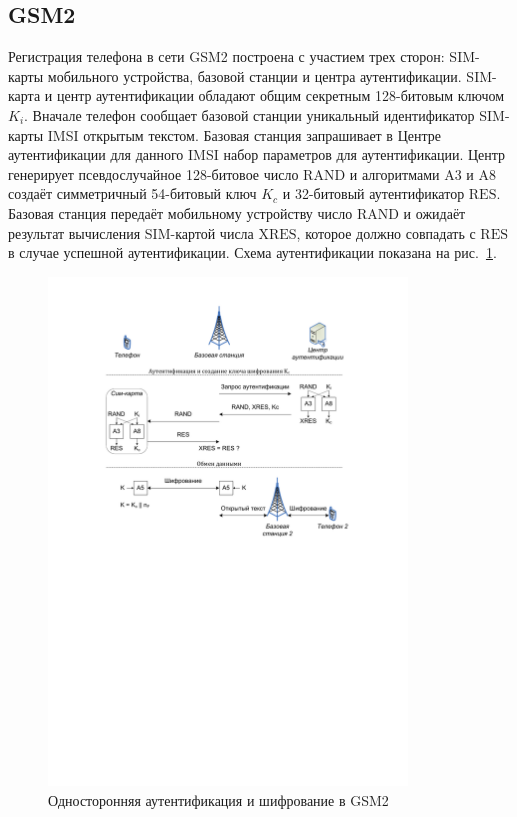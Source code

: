 \subsection{GSM2}

Регистрация телефона в сети GSM2 построена с участием трех сторон: SIM-карты мобильного устройства, базовой станции и центра аутентификации. SIM-карта и центр аутентификации обладают общим секретным 128-битовым ключом $K_i$. Вначале телефон сообщает базовой станции уникальный идентификатор SIM-карты IMSI открытым текстом. Базовая станция запрашивает в Центре аутентификации для данного IMSI набор параметров для аутентификации. Центр генерирует псевдослучайное 128-битовое число $\textrm{RAND}$ и алгоритмами A3 и A8 создаёт симметричный 54-битовый ключ $K_c$ и 32-битовый аутентификатор $\textrm{RES}$. Базовая станция передаёт мобильному устройству число $\textrm{RAND}$ и ожидаёт результат вычисления SIM-картой числа $\textrm{XRES}$, которое должно совпадать с $\textrm{RES}$ в случае успешной аутентификации. Схема аутентификации показана на рис.~\ref{fig:gsm2}.

\begin{figure}[!ht]
	\centering
	\includegraphics[width=0.85\textwidth]{pic/gsm2}
	\caption{Односторонняя аутентификация и шифрование в GSM2\label{fig:gsm2}}
\end{figure}

